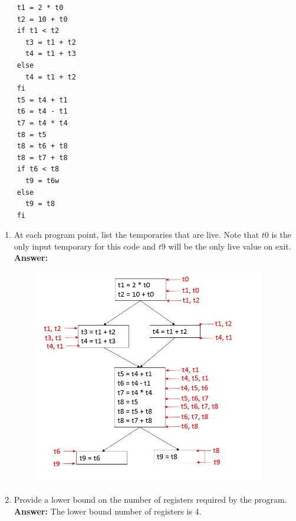\documentclass[11pt]{article}
\begin{document}
\begin{enumerate}
  \begin{lstlisting}
    t1 = 2 * t0
    t2 = 10 + t0
    if t1 < t2
      t3 = t1 + t2
      t4 = t1 + t3
    else
      t4 = t1 + t2
    fi
    t5 = t4 + t1
    t6 = t4 - t1
    t7 = t4 * t4
    t8 = t5
    t8 = t6 + t8
    t8 = t7 + t8
    if t6 < t8
      t9 = t6w
    else
      t9 = t8
    fi
  \end{lstlisting}
  \begin{enumerate}
    \item At each program point, list the temporaries that are live. Note that $t0$ is the only input temporary for this code and $t9$ will be the only live value on exit.\\
    \textbf{Answer:} 
    \begin{figure}[h]
    \includegraphics[width=10cm]{1.jpg}
    \end{figure}
    
   \newpage
    \item Provide a lower bound on the number of registers required by the program.\\
    \textbf{Answer:} 
    The lower bound number of registers is 4. 
    

\end{enumerate}
\end{enumerate}
\end{document}
